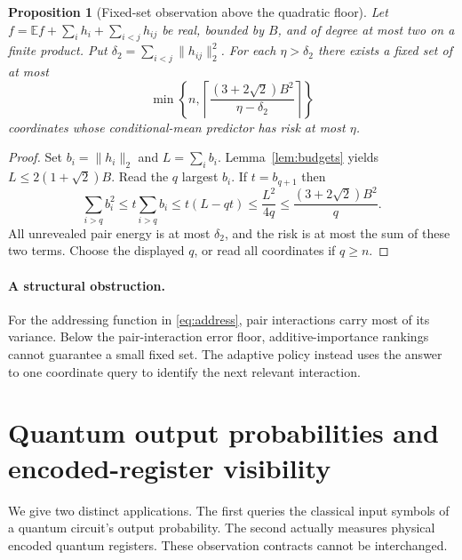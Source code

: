 \documentclass[11pt,letterpaper]{article}
\newtheorem{proposition}[theorem]{Proposition}
\theoremstyle{definition}
\newcommand{\E}{\mathbb E}
\newcommand{\norm}[1]{\lVert #1\rVert}
\begin{document}
\begin{proposition}[Fixed-set observation above the quadratic floor]\label{prop:fixed}
Let $f=\E f+\sum_i h_i+\sum_{i<j}h_{ij}$ be real, bounded by $B$,
and of degree at most two on a finite product. Put
$\delta_2=\sum_{i<j}\norm{h_{ij}}_2^2$. For each $\eta>\delta_2$
there exists a fixed set of at most
\begin{equation}\label{eq:fixed}
\min\left\{n,\left\lceil
\frac{(3+2\sqrt2)B^2}{\eta-\delta_2}\right\rceil\right\}
\end{equation}
coordinates whose conditional-mean predictor has risk at most $\eta$.
\end{proposition}
\begin{proof}
Set $b_i=\norm{h_i}_2$ and $L=\sum_i b_i$. Lemma~\ref{lem:budgets}
yields $L\le2(1+\sqrt2)B$. Read the $q$ largest $b_i$. If
$t=b_{q+1}$ then
\[
\sum_{i>q}b_i^2\le t\sum_{i>q}b_i\le t(L-qt)\le\frac{L^2}{4q}
\le\frac{(3+2\sqrt2)B^2}{q}.
\]
All unrevealed pair energy is at most $\delta_2$, and the risk is
at most the sum of these two terms. Choose the displayed $q$, or read
all coordinates if $q\ge n$.
\end{proof}
\paragraph{A structural obstruction.}
For the addressing function in \eqref{eq:address}, pair interactions
carry most of its variance. Below the pair-interaction error floor,
additive-importance rankings cannot guarantee a small fixed set. The
adaptive policy instead uses the answer to one coordinate query to
identify the next relevant interaction.

\section{Quantum output probabilities and encoded-register visibility}\label{sec:quantum}
We give two distinct applications. The first queries the classical
input symbols of a quantum circuit's output probability. The second
actually measures physical encoded quantum registers. These observation
contracts cannot be interchanged.
\end{document}
